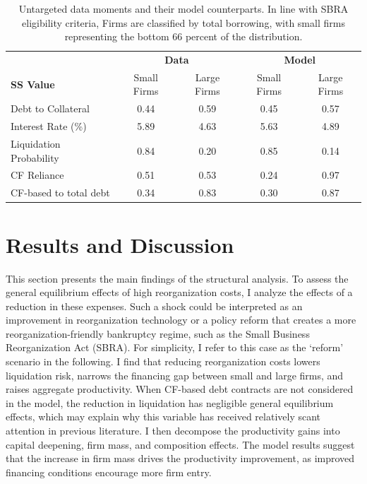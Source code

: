 \documentclass[12pt]{article}
\begin{document}
\begin{table}[h!]
    \centering
    \begin{tabular}{lcccc}
    \toprule
     &  \multicolumn{2}{c}{\textbf{Data}} & \multicolumn{2}{c}{\textbf{Model}} \\ 
     \textbf{SS Value}  & Small Firms & Large Firms & Small Firms & Large Firms  \\ 
    \midrule
    Debt to Collateral & 0.44 & 0.59 & 0.45 & 0.57 \\ 
    Interest Rate (\%) & 5.89 & 4.63 & 5.63 & 4.89 \\ 
    Liquidation Probability & 0.84 & 0.20 & 0.85 & 0.14 \\ 
    CF Reliance & 0.51 & 0.53 & 0.24 & 0.97 \\ 
    CF-based to total debt & 0.34 & 0.83 & 0.30 & 0.87 \\ 
    \bottomrule
    \end{tabular}
    \caption{\small Untargeted data moments and their model counterparts. In line with SBRA eligibility criteria, Firms are classified by total borrowing, with small firms representing the bottom 66 percent of the distribution.}
    \label{tab:untargeted}
\end{table}


\section{Results and Discussion \label{sec:results}}

This section presents the main findings of the structural analysis. To assess the general equilibrium effects of high reorganization costs, I analyze the effects of a reduction in these expenses. Such a shock could be interpreted as an improvement in reorganization technology or a policy reform that creates a more reorganization-friendly bankruptcy regime, such as the Small Business Reorganization Act (SBRA). For simplicity, I refer to this case as the `reform' scenario in the following. I find that reducing reorganization costs lowers liquidation risk, narrows the financing gap between small and large firms, and raises aggregate productivity. When CF-based debt contracts are not considered in the model, the reduction in liquidation has negligible general equilibrium effects, which may explain why this variable has received relatively scant attention in previous literature. I then decompose the productivity gains into capital deepening, firm mass, and composition effects. The model results suggest that the increase in firm mass drives the productivity improvement, as improved financing conditions encourage more firm entry.
\end{document}
